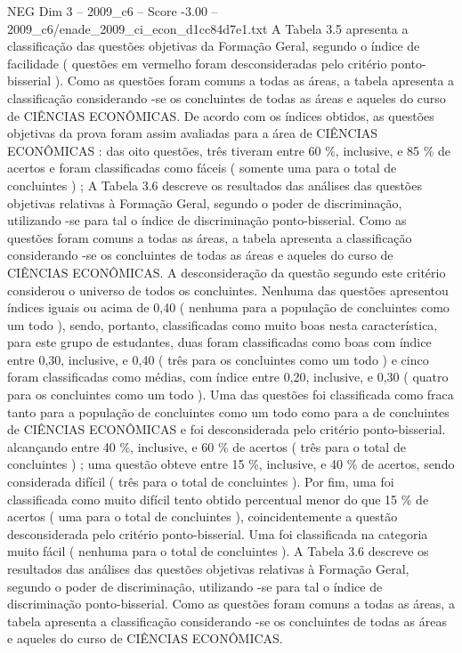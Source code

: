 \begin{textsample}{NEG Dim 3 – 2009\_c6 – Score -3.00 – 2009\_c6/enade\_2009\_ci\_econ\_d1cc84d7e1.txt}
A Tabela 3.5 apresenta a classificação das questões objetivas da Formação Geral, segundo o índice de facilidade ( questões em vermelho foram desconsideradas pelo critério ponto-bisserial ).
Como as questões foram comuns a todas as áreas, a tabela apresenta a classificação considerando -se os concluintes de todas as áreas e aqueles do curso de CIÊNCIAS ECONÔMICAS.
De acordo com os índices obtidos, as questões objetivas da prova foram assim avaliadas para a área de CIÊNCIAS ECONÔMICAS : das oito questões, três tiveram entre 60 \%, inclusive, e 85 \% de acertos e foram classificadas como fáceis ( somente uma para o total de concluintes ) ; A Tabela 3.6 descreve os resultados das análises das questões objetivas relativas à Formação Geral, segundo o poder de discriminação, utilizando -se para tal o índice de discriminação ponto-bisserial.
Como as questões foram comuns a todas as áreas, a tabela apresenta a classificação considerando -se os concluintes de todas as áreas e aqueles do curso de CIÊNCIAS ECONÔMICAS.
A desconsideração da questão segundo este critério considerou o universo de todos os concluintes.
Nenhuma das questões apresentou índices iguais ou acima de 0,40 ( nenhuma para a população de concluintes como um todo ), sendo, portanto, classificadas como muito boas nesta característica, para este grupo de estudantes, duas foram classificadas como boas com índice entre 0,30, inclusive, e 0,40 ( três para os concluintes como um todo ) e cinco foram classificadas como médias, com índice entre 0,20, inclusive, e 0,30 ( quatro para os concluintes como um todo ).
Uma das questões foi classificada como fraca tanto para a população de concluintes como um todo como para a de concluintes de CIÊNCIAS ECONÔMICAS e foi desconsiderada pelo critério ponto-bisserial. alcançando entre 40 \%, inclusive, e 60 \% de acertos ( três para o total de concluintes ) ; uma questão obteve entre 15 \%, inclusive, e 40 \% de acertos, sendo considerada difícil ( três para o total de concluintes ).
Por fim, uma foi classificada como muito difícil tento obtido percentual menor do que 15 \% de acertos ( uma para o total de concluintes ), coincidentemente a questão desconsiderada pelo critério ponto-bisserial.
Uma foi classificada na categoria muito fácil ( nenhuma para o total de concluintes ).
A Tabela 3.6 descreve os resultados das análises das questões objetivas relativas à Formação Geral, segundo o poder de discriminação, utilizando -se para tal o índice de discriminação ponto-bisserial.
Como as questões foram comuns a todas as áreas, a tabela apresenta a classificação considerando -se os concluintes de todas as áreas e aqueles do curso de CIÊNCIAS ECONÔMICAS.

\end{textsample}
